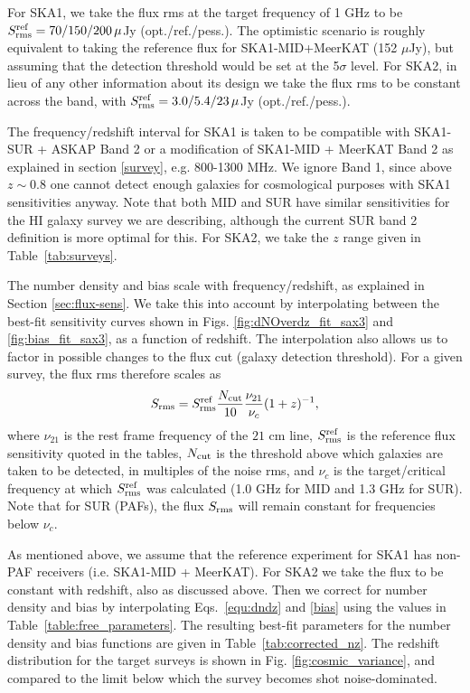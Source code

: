 \documentclass[useAMS,usenatbib]{mn2e}
\newcommand{\be}{\begin{equation}}
\newcommand{\ee}{\end{equation}}
\begin{document}
For SKA1, we take the flux rms at the target frequency of 1 GHz to be $S^{\rm ref}_{\rm rms} = 70/150/200\, \mu$Jy (opt./ref./pess.). The optimistic scenario is roughly equivalent to taking the reference flux for SKA1-MID+MeerKAT (152 $\mu$Jy), but assuming that the detection threshold would be set at the 5$\sigma$ level. For SKA2, in lieu of any other information about its design we take the flux rms to be constant across the band, with $S^{\rm ref}_{\rm rms} = 3.0/5.4/23\, \mu$Jy (opt./ref./pess.).

The frequency/redshift interval for SKA1 is taken to be compatible with SKA1-SUR + ASKAP Band 2 or a modification of SKA1-MID + MeerKAT Band 2 as explained in section \ref{survey}, e.g. 800-1300 MHz. We ignore Band 1, since above $z\sim 0.8$ one cannot detect enough galaxies for cosmological purposes with SKA1 sensitivities anyway. Note that both MID and SUR have similar sensitivities for the HI galaxy survey we are describing, although the current SUR band 2 definition is more optimal for this.
For SKA2, we take the $z$ range given in Table~\ref{tab:surveys}.

The number density and bias scale with frequency/redshift, as explained in Section \ref{sec:flux-sens}. We take this into account by interpolating between the best-fit sensitivity curves shown in Figs. \ref{fig:dNOverdz_fit_sax3} and \ref{fig:bias_fit_sax3}, as a function of redshift. The interpolation also allows us to factor in possible changes to the flux cut (galaxy detection threshold). For a given survey, the flux rms therefore scales as
\be
S_{\rm rms} = S^{\rm ref}_{\rm rms}\frac{N_{\rm cut}}{10} \frac{\nu_{21}}{\nu_c} (1 + z)^{-1},
\ee
where $\nu_{21}$ is the rest frame frequency of the $21$ cm line, $S^{\rm ref}_{\rm rms}$ is the reference flux sensitivity quoted in the tables, $N_{\rm cut}$ is the threshold above which galaxies are taken to be detected, in multiples of the noise rms, and $\nu_c$ is the target/critical frequency at which $S^{\rm ref}_{\rm rms}$ was calculated (1.0 GHz for MID and 1.3 GHz for SUR). Note that for SUR (PAFs), the flux $S_{\rm rms}$ will remain constant for frequencies below $\nu_c$.
 
As mentioned above, we assume that the reference experiment for SKA1 has non-PAF receivers (i.e. SKA1-MID + MeerKAT). For SKA2 we take the flux to be constant with redshift, also as discussed above. Then we correct for  number density and bias by interpolating Eqs.~\eqref{equ:dndz} and \eqref{bias} using the values in Table~\ref{table:free_parameters}.
The resulting best-fit parameters for the number density and bias functions are given in Table~\ref{tab:corrected_nz}. The redshift distribution for the target surveys is shown in Fig. \ref{fig:cosmic_variance}, and compared to the limit below which the survey becomes shot noise-dominated.
\end{document}
